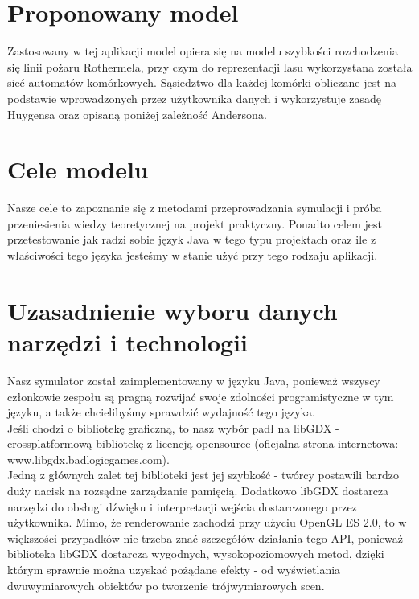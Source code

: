 \documentclass[a4paper, 11pt]{article}
\begin{document}
	\section{Proponowany model}
	\indent
	
	Zastosowany w tej aplikacji model opiera się na modelu szybkości rozchodzenia się linii pożaru Rothermela, przy czym do reprezentacji lasu wykorzystana została sieć automatów komórkowych. Sąsiedztwo dla każdej komórki obliczane jest na podstawie wprowadzonych przez użytkownika danych i wykorzystuje zasadę Huygensa oraz opisaną poniżej zależność Andersona. \\
	
	\section*{Cele modelu}
	\indent
	
	Nasze cele to zapoznanie się z metodami przeprowadzania symulacji i próba przeniesienia wiedzy teoretycznej na projekt praktyczny. Ponadto celem jest przetestowanie jak radzi sobie język Java w tego typu projektach oraz ile z właściwości tego języka jesteśmy w stanie użyć przy tego rodzaju aplikacji.
	
	\section*{Uzasadnienie wyboru danych narzędzi i technologii}
	\indent
	
	Nasz symulator został zaimplementowany w języku Java, ponieważ wszyscy członkowie zespołu są pragną rozwijać swoje zdolności programistyczne w tym języku, a także chcielibyśmy sprawdzić wydajność tego języka.\\
	
	Jeśli chodzi o bibliotekę graficzną, to nasz wybór padł na libGDX - crossplatformową bibliotekę z licencją opensource (oficjalna strona internetowa: www.libgdx.badlogicgames.com). \\
	
	Jedną z głównych zalet tej biblioteki jest jej szybkość - twórcy postawili bardzo duży nacisk na rozsądne zarządzanie pamięcią.  Dodatkowo libGDX dostarcza narzędzi do obsługi dźwięku i interpretacji wejścia dostarczonego przez użytkownika. Mimo, że renderowanie zachodzi przy użyciu OpenGL ES 2.0, to w większości przypadków nie trzeba znać szczegółów działania tego API, ponieważ biblioteka libGDX dostarcza wygodnych, wysokopoziomowych metod, dzięki którym sprawnie można uzyskać pożądane efekty - od wyświetlania dwuwymiarowych obiektów po tworzenie trójwymiarowych scen.\\
	
\end{document}
